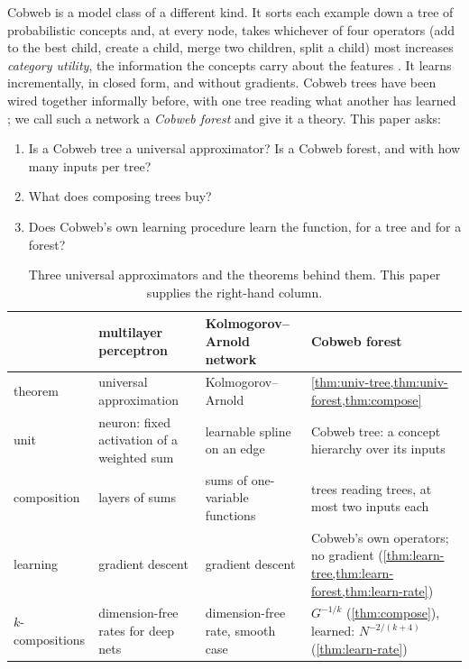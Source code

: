 \documentclass[11pt]{article}
\theoremstyle{definition}
\theoremstyle{remark}
\begin{document}
Cobweb \citep{fisher1987} is a model class of a different kind.  It sorts each example
down a tree of probabilistic concepts and, at every node, takes whichever of four
operators (add to the best child, create a child, merge two children, split a child) most
increases \emph{category utility}, the information the concepts carry about the features
\citep{corter1992,maclellan2026rational}.  It learns incrementally, in closed form, and
without gradients.  Cobweb trees have been wired together informally before, with one
tree reading what another has learned \citep{maclellan2021conv,singaravadivelan2026trellis};
we call such a network a \emph{Cobweb forest} and give it a theory.  This paper asks:
\begin{enumerate}[label=\textbf{Q\arabic*.},leftmargin=*,noitemsep]
\item Is a Cobweb tree a universal approximator?  Is a Cobweb forest, and with how many
  inputs per tree?
\item What does composing trees buy?
\item Does Cobweb's own learning procedure learn the function, for a tree and for a forest?
\end{enumerate}

\begin{table}[t]
\centering\small
\begin{tabular}{@{}p{2.6cm}p{4.0cm}p{4.0cm}p{4.4cm}@{}}\toprule
 & multilayer perceptron & Kolmogorov--Arnold network & Cobweb forest\\\midrule
theorem & universal approximation \citep{cybenko1989,hornik1989} & Kolmogorov--Arnold \citep{kolmogorov1957} & \cref{thm:univ-tree,thm:univ-forest,thm:compose}\\
unit & neuron: fixed activation of a weighted sum & learnable spline on an edge & Cobweb tree: a concept hierarchy over its inputs\\
composition & layers of sums & sums of one-variable functions & trees reading trees, at most two inputs each\\
learning & gradient descent & gradient descent & Cobweb's own operators; no gradient (\cref{thm:learn-tree,thm:learn-forest,thm:learn-rate})\\
$k$-compositions & dimension-free rates for deep nets \citep{poggio2017} & dimension-free rate, smooth case \citep{liu2024kan} & $G^{-1/k}$ (\cref{thm:compose}), learned: $N^{-2/(k+4)}$ (\cref{thm:learn-rate})\\
\bottomrule
\end{tabular}
\caption{Three universal approximators and the theorems behind them.  This paper supplies
the right-hand column.}
\label{tab:three}
\end{table}
\end{document}
